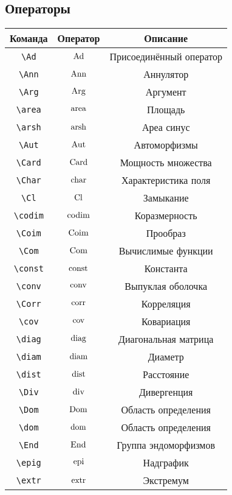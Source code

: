 \documentclass[a4paper]{article}
\begin{document}
\subsection{Операторы}
\begin{center}
\begin{tabular}{|c|c|c|}
\hline \textbf{Команда} & \textbf{Оператор} & \textbf{Описание} \\
\hline \verb'\Ad'  & $\operatorname{Ad}$  &   Присоединённый оператор  \\
\hline \verb'\Ann' & $\operatorname{Ann}$ &   Аннулятор  \\
\hline \verb'\Arg' & $\operatorname{Arg}$ &   Аргумент  \\
\hline \verb'\area' & $\operatorname{area}$ & Площадь    \\
\hline \verb'\arsh' & $\operatorname{arsh}$ & Ареа синус  \\
\hline \verb'\Aut' & $\operatorname{Aut}$ &  Автоморфизмы \\
\hline \verb'\Card' & $\operatorname{Card}$ & Мощность множества  \\
\hline \verb'\Char' & $\operatorname{char}$ & Характеристика поля  \\
\hline \verb'\Cl' & $\operatorname{Cl}$ &   Замыкание  \\
\hline \verb'\codim' & $\operatorname{codim}$ & Коразмерность    \\
\hline \verb'\Coim' & $\operatorname{Coim}$ & Прообраз    \\
\hline \verb'\Com' & $\operatorname{Com}$ & Вычислимые функции    \\
\hline \verb'\const' & $\operatorname{const}$ & Константа    \\
\hline \verb'\conv' & $\operatorname{conv}$ & Выпуклая оболочка    \\
\hline \verb'\Corr' & $\operatorname{corr}$ &  Корреляция   \\
\hline \verb'\cov' & $\operatorname{cov}$ &   Ковариация  \\
\hline \verb'\diag' & $\operatorname{diag}$ & Диагональная матрица  \\
\hline \verb'\diam' & $\operatorname{diam}$ &  Диаметр   \\
\hline \verb'\dist' & $\operatorname{dist}$ &  Расстояние   \\
\hline \verb'\Div' & $\operatorname{div}$ &   Дивергенция  \\
\hline \verb'\Dom' & $\operatorname{Dom}$ &   Область определения  \\
\hline \verb'\dom' & $\operatorname{dom}$ &   Область определения  \\
\hline \verb'\End' & $\operatorname{End}$ &  Группа эндоморфизмов \\
\hline \verb'\epig' & $\operatorname{epi}$ &  Надграфик \\
\hline \verb'\extr' & $\operatorname{extr}$ &  Экстремум \\

\end{tabular}
\end{center}
\end{document}
